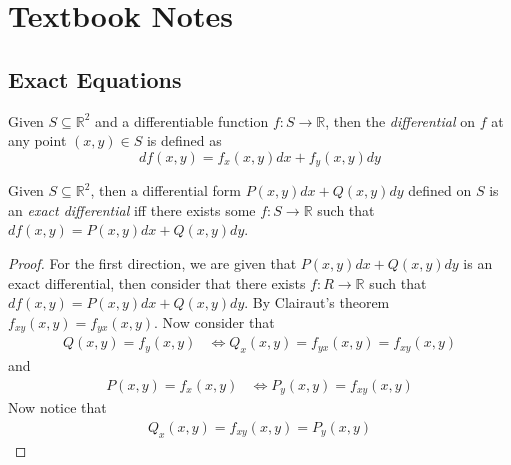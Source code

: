 \documentclass[notes]{subfiles}
\begin{document}
\setcounter{section}{3}
\section{Textbook Notes}
\subsection{Exact Equations}

\begin{definition}
    Given $S \subseteq \mathbb{R}^2$ and a differentiable function $f\colon S \to \mathbb{R}$, then the \textit{differential} on $f$ at any point $(x, y) \in S$ is defined as
    \[
        df(x, y) = f_x(x, y)dx + f_y(x, y)dy
    \]
\end{definition}

\begin{definition}
    Given $S \subseteq \mathbb{R}^2$, then a differential form $P(x, y)dx + Q(x, y)dy$ defined on $S$ is an \textit{exact differential} iff there exists some $f\colon S \to \mathbb{R}$ such that $df(x, y) = P(x, y)dx + Q(x, y)dy$.
\end{definition}

\begin{proof}
    For the first direction, we are given that $P(x, y)dx + Q(x, y)dy$ is an exact differential, then consider that there exists $f\colon R \to \mathbb{R}$ such that $df(x, y) = P(x, y)dx + Q(x, y)dy$. By Clairaut's theorem $f_{xy}(x, y) = f_{yx}(x, y)$. Now consider that
    \begin{align*}
        Q(x, y) = f_y(x, y)
        &\iff Q_x(x, y) = f_{yx}(x, y) = f_{xy}(x, y)
    \end{align*}
    and
    \begin{align*}
        P(x, y) = f_x(x, y)
        &\iff P_y(x, y) = f_{xy}(x, y)
    \end{align*}
    Now notice that
    \begin{align*}
        Q_x(x, y) = f_{xy}(x, y) = P_y(x, y)
    \end{align*}
\end{proof}
\end{document}
